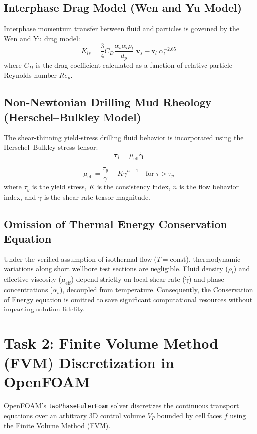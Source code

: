 \documentclass[12pt,a4paper]{article}
\begin{document}
\subsection{Interphase Drag Model (Wen and Yu Model)}
Interphase momentum transfer between fluid and particles is governed by the Wen and Yu drag model:
\begin{equation}
K_{ls} = \frac{3}{4} C_D \frac{\alpha_s \alpha_l \rho_l}{d_p} |\mathbf{v}_s - \mathbf{v}_l| \alpha_l^{-2.65}
\end{equation}
where $C_D$ is the drag coefficient calculated as a function of relative particle Reynolds number $Re_p$.

\subsection{Non-Newtonian Drilling Mud Rheology (Herschel--Bulkley Model)}
The shear-thinning yield-stress drilling fluid behavior is incorporated using the Herschel--Bulkley stress tensor:
\begin{equation}
\boldsymbol{\tau}_l = \mu_{\text{eff}} \dot{\boldsymbol{\gamma}}
\end{equation}

\begin{equation}
\mu_{\text{eff}} = \frac{\tau_y}{\dot{\gamma}} + K \dot{\gamma}^{n-1} \quad \text{for } \tau > \tau_y
\end{equation}
where $\tau_y$ is the yield stress, $K$ is the consistency index, $n$ is the flow behavior index, and $\dot{\gamma}$ is the shear rate tensor magnitude.

\subsection{Omission of Thermal Energy Conservation Equation}
Under the verified assumption of isothermal flow ($T = \text{const}$), thermodynamic variations along short wellbore test sections are negligible. Fluid density ($\rho_l$) and effective viscosity ($\mu_{\text{eff}}$) depend strictly on local shear rate ($\dot{\gamma}$) and phase concentrations ($\alpha_s$), decoupled from temperature. Consequently, the Conservation of Energy equation is omitted to save significant computational resources without impacting solution fidelity.

\section{Task 2: Finite Volume Method (FVM) Discretization in OpenFOAM}
OpenFOAM's \texttt{twoPhaseEulerFoam} solver discretizes the continuous transport equations over an arbitrary 3D control volume $V_P$ bounded by cell faces $f$ using the Finite Volume Method (FVM).
\end{document}

